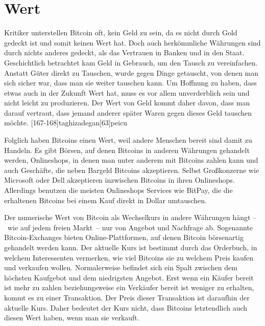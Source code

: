 \section{Wert}

Kritiker unterstellen Bitcoin oft, kein Geld zu sein, da es nicht durch Gold gedeckt ist und somit keinen Wert hat.
Doch auch herkömmliche Währungen sind durch nichts anderes gedeckt, als das Vertrauen in Banken und in den Staat.
Geschichtlich betrachtet kam Geld in Gebrauch, um den Tausch zu vereinfachen.
Anstatt Güter direkt zu Tauschen, wurde gegen Dinge getauscht, von denen man sich sicher war, dass man sie weiter tauschen kann.
Um Hoffnung zu haben, dass etwas auch in der Zukunft Wert hat, muss es vor allem unverderblich sein und nicht leicht zu produzieren.
Der Wert von Geld kommt daher davon, dass man darauf vertraut, dass jemand anderer später Waren gegen dieses Geld tauschen möchte.
[167-168]{taghizadegan}[63]{peicu}

Folglich haben Bitcoins einen Wert, weil andere Menschen bereit sind damit zu Handeln.
Es gibt Börsen, auf denen Bitcoins in anderen Währungen gehandelt werden, Onlineshops, in denen man unter anderem mit Bitcoins zahlen kann und auch Geschäfte, die neben Bargeld Bitcoins akzeptieren.
Selbst Großkonzerne wie Microsoft oder Dell akzeptieren inzwischen Bitcoins in ihren Onlineshops.
Allerdings benutzen die meisten Onlineshops Services wie BitPay, die die erhaltenen Bitcoins bei einem Kauf direkt in Dollar umtauschen.

Der numerische Wert von Bitcoin als Wechselkurs in andere Währungen hängt --~wie auf jedem freien Markt~-- nur von Angebot und Nachfrage ab.
Sogenannte Bitcoin-Exchanges bieten Online-Plattformen, auf denen Bitcoin börsenartig gehandelt werden kann.
Der aktuelle Kurs ist bestimmt durch das Orderbuch, in welchem Interessenten vermerken, wie viel Bitcoins sie zu welchem Preis kaufen und verkaufen wollen.
Normalerweise befindet sich ein Spalt zwischen dem höchsten Kaufgebot und dem niedrigsten Angebot.
Erst wenn ein Käufer bereit ist mehr zu zahlen beziehungsweise ein Verkäufer bereit ist weniger zu erhalten, kommt es zu einer Transaktion.
Der Preis dieser Transaktion ist daraufhin der aktuelle Kurs.
Daher bedeutet der Kurs nicht, dass Bitcoins letztendlich auch diesen Wert haben, wenn man sie verkauft.
